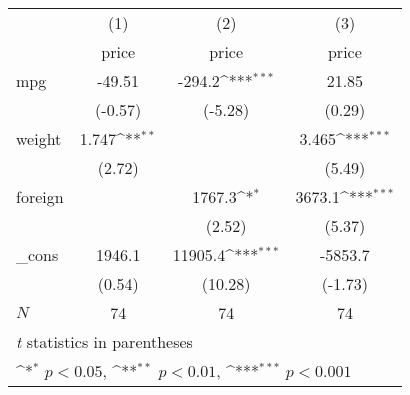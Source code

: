 {
\def\sym#1{\ifmmode^{#1}\else\(^{#1}\)\fi}
\begin{tabular}{l*{3}{c}}
\hline\hline
            &\multicolumn{1}{c}{(1)}&\multicolumn{1}{c}{(2)}&\multicolumn{1}{c}{(3)}\\
            &\multicolumn{1}{c}{price}&\multicolumn{1}{c}{price}&\multicolumn{1}{c}{price}\\
\hline
mpg         &      -49.51         &      -294.2\sym{***}&       21.85         \\
            &     (-0.57)         &     (-5.28)         &      (0.29)         \\
[1em]
weight      &       1.747\sym{**} &                     &       3.465\sym{***}\\
            &      (2.72)         &                     &      (5.49)         \\
[1em]
foreign     &                     &      1767.3\sym{*}  &      3673.1\sym{***}\\
            &                     &      (2.52)         &      (5.37)         \\
[1em]
\_cons      &      1946.1         &     11905.4\sym{***}&     -5853.7         \\
            &      (0.54)         &     (10.28)         &     (-1.73)         \\
\hline
\(N\)       &          74         &          74         &          74         \\
\hline\hline
\multicolumn{4}{l}{\footnotesize \textit{t} statistics in parentheses}\\
\multicolumn{4}{l}{\footnotesize \sym{*} \(p<0.05\), \sym{**} \(p<0.01\), \sym{***} \(p<0.001\)}\\
\end{tabular}
}
